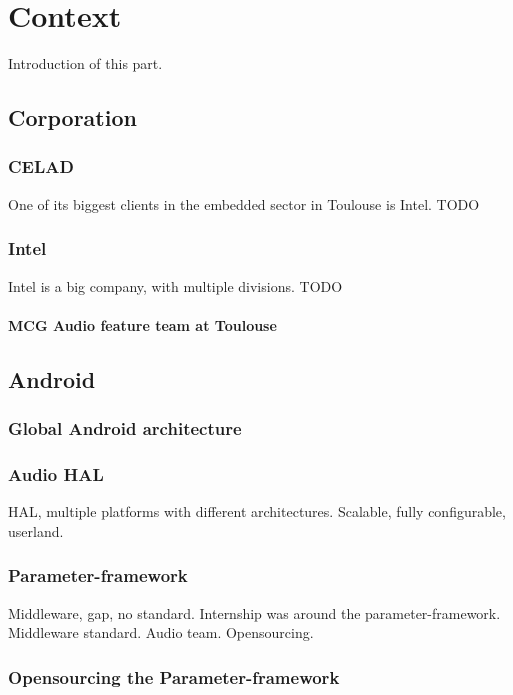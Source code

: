 \chapter{Context}

Introduction of this part.

\section{Corporation}

\subsection{CELAD}
One of its biggest clients in the embedded sector in Toulouse is Intel.
TODO

\subsection{Intel}
Intel is a big company, with multiple divisions.
TODO

\subsubsection{MCG Audio feature team at Toulouse}

\section{Android}

\subsection{Global Android architecture}

\subsection{Audio HAL}
HAL, multiple platforms with different architectures.
Scalable, fully configurable, userland.

\subsection{Parameter-framework}
\label{sec:parameter-framework}
Middleware, gap, no standard.
Internship was around the parameter-framework. Middleware standard. Audio team. Opensourcing.

\subsection{Opensourcing the Parameter-framework}
